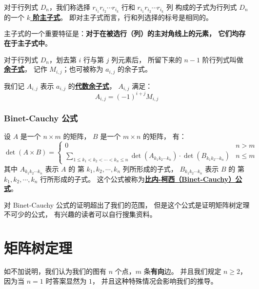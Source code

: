 \documentclass[UTF8]{article}
\begin{document}
	\bigskip


	对于行列式 $D_n$，我们称选择
	$r_{i_1} r_{i_2} \cdots r_{i_k}$ 行和
	$r_{i_1} r_{i_2} \cdots r_{i_k}$ 列
	构成的子式为行列式 $D_n$ 的一个 \textbf{\uline{$k$ 阶主子式}}。
	即对主子式而言，行和列选择的标号是相同的。

	主子式的一个重要特征是：\textbf{对于在被选行（列）的主对角线上的元素，
	它们均存在于主子式中}。

	\bigskip


	对于行列式 $D_n$，划去第 $i$ 行与第 $j$ 列元素后，
	所留下来的 $n - 1$ 阶行列式叫做\textbf{\uline{余子式}}，
	记作 $M_{i, j}$；也可被称为 $a_{i, j}$ 的余子式。

	\bigskip


	我们记 $A_{i, j}$ 表示 $a_{i, j}$ 的\textbf{\uline{代数余子式}}，
	$A_{i, j}$ 满足：
	$$
	A_{i, j} = (-1)^{i + j}M_{i, j}
	$$

	\subsubsection{Binet-Cauchy 公式}

	设 $A$ 是一个 $n \times m$ 的矩阵，
	$B$ 是一个 $m \times n$ 的矩阵，
	有：
	\begin{equation*}
		\det(A \times B) =
		\begin{cases}
			0 & n > m
			\\
			\sum_{1 \le k_1 < k_2 < \cdots < k_n \le n}
			\det(A_{k_1 k_2 \cdots k_n}) \cdot
			\det(B_{k_1 k_2 \cdots k_n})
			& n \le m
		\end{cases}
	\end{equation*}
	其中 $A_{k_1 k_2 \cdots k_n}$ 表示 $A$ 的
	第 $k_1, k_2, \cdots, k_n$ 列所形成的子式，
	$B_{k_1 k_2 \cdots k_n}$ 表示 $B$ 的
	第 $k_1, k_2, \cdots, k_n$ 行所形成的子式。
	这个公式被称为\textbf{\uline{比内-柯西（Binet-Cauchy）公式}}。

	对 Binet-Cauchy 公式的证明超出了我们的范围，
	但是这个公式是证明矩阵树定理不可少的公式，
	有兴趣的读者可以自行搜集资料。

	\section{矩阵树定理}

	如不加说明，我们认为我们的图有 $n$ 个点，$m$ 条\textbf{有向}边。
	并且我们规定 $n \ge 2$，因为当 $n = 1$ 时答案显然为 $1$，
	并且这种特殊情况会影响我们的推导。
\end{document}
